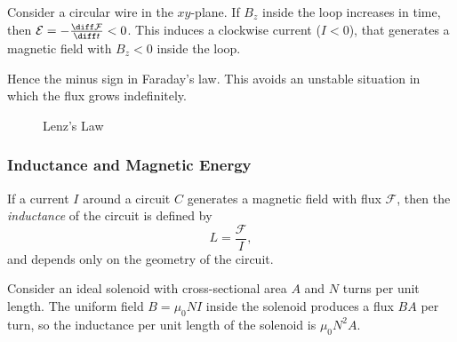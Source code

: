 \documentclass[12pt]{article}
\begin{document}
\begin{exbox}
	Consider a circular wire in the $xy$-plane. If $B_z$ inside the loop increases in time, then $\mathcal{E} = - \frac{\diff \mathcal{F}}{\diff t} < 0$. This induces a clockwise current ($I < 0$), that generates a magnetic field with $B_z < 0$ inside the loop.

	Hence the minus sign in Faraday's law. This avoids an unstable situation in which the flux grows indefinitely.
\end{exbox}

\begin{figure}[h]
	\centering
	\caption{Lenz's Law}
	\label{fig:lenzs_law}
\end{figure}

\subsubsection{Inductance and Magnetic Energy}
\label{subsub:inductance_and_magnetic_energy}

If a current $I$ around a circuit $C$ generates a magnetic field with flux $\mathcal{F}$, then the \emph{inductance} of the circuit is defined by
\[
L = \frac{\mathcal{F}}{I}
,\]
and depends only on the geometry of the circuit.

\begin{exbox}
	Consider an ideal solenoid with cross-sectional area $A$ and $N$ turns per unit length. The uniform field $B = \mu_0 N I$ inside the solenoid produces a flux $BA$ per turn, so the inductance per unit length of the solenoid is $\mu_0 N^2 A$.
\end{exbox}
\end{document}
